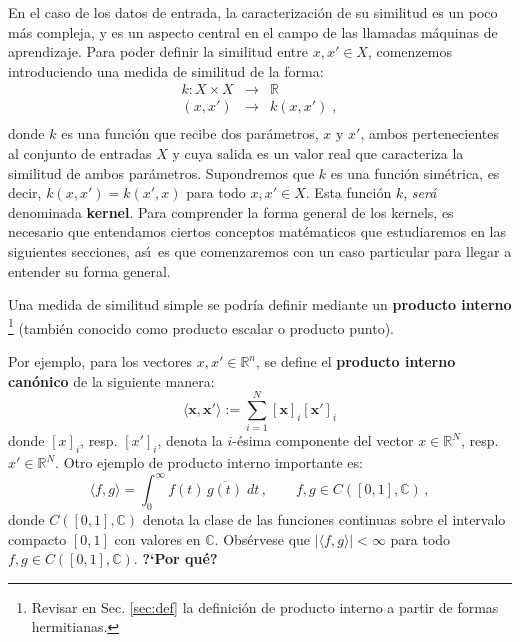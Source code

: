 \documentclass[12pt,reqno]{amsart}
\begin{document}
En el caso de los datos de entrada, la caracterizaci\'on de  su
similitud es un poco m\'as compleja, y es un aspecto central en el campo de
las llamadas m\'aquinas de aprendizaje.
Para poder definir la similitud entre $x,x'\in X$, comenzemos introduciendo una medida de similitud de la forma:
\begin{equation}
\begin{array}{rcl}
k: X\times X & \rightarrow & \mathbb{R} \\ 
    (x,x')   & \rightarrow & k(x,x')\;, \\
\end{array}
\end{equation}
donde $k$ es una funci\'on que recibe dos
par\'ametros, $x$ y $x'$, ambos pertenecientes al conjunto de entradas
$X$ y cuya salida es un valor real que caracteriza la similitud de ambos
par\'ametros.
Supondremos que $k$ es una funci\'on sim\'etrica,
es decir, $k(x,x')= k(x',x)$ para todo $x,x'\in X$.
Esta funci\'on $k$, {\em ser\'a\/} denominada {\bf kernel}.
Para comprender la forma general de los kernels, es necesario que
entendamos ciertos conceptos mat\'ematicos que estudiaremos en las siguientes
secciones,
as\'\i\ es que comenzaremos con un caso particular para llegar a entender su
forma general.


Una medida de similitud simple se podr\'ia definir mediante un \textbf{producto interno}
\footnote{Revisar en Sec. \ref{sec:def} la definici\'on de producto
interno a partir de formas hermitianas.}
(tambi\'en conocido como producto escalar o producto punto).

Por ejemplo, para los vectores $x,x'\in\mathbb{R}^n$, se define
el \textbf{producto interno can\'onico} de la siguiente manera:
\begin{equation}
\langle\mathbf{x},\mathbf{x'}\rangle
:= \sum \limits_{i=1}^{N} [\mathbf{x}]_i [\mathbf{x'}]_i 
\end{equation}
{\color{red} donde $[x]_i$, resp.  $[x']_i$, denota la $i$-\'esima
componente del vector $x\in\mathbb{R}^N$, resp.  $x'\in\mathbb{R}^N$.
Otro ejemplo de producto interno importante es:
\begin{equation*}
\langle f,g\rangle = \int_0^\infty f(t)\,\overline{g(t)}\;dt\,,\qquad
f,g\in C([0,1],\mathbb{C})\,,
\end{equation*}
donde $C([0,1],\mathbb{C})$ denota la clase de las funciones
continuas sobre el intervalo compacto $[0,1]$ con valores en
$\mathbb{C}$.
Obs\'ervese que $|\langle f,g\rangle|<\infty$ para todo
$f,g\in C([0,1],\mathbb{C})$.
{\bf ?`Por qu\'e?}}
\end{document}
